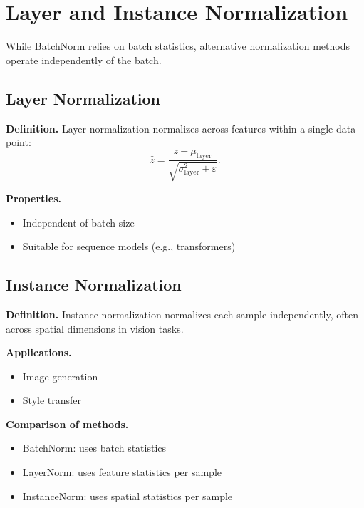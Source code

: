 \section{Layer and Instance Normalization}

While BatchNorm relies on batch statistics, alternative normalization methods operate independently of the batch.

\subsection{Layer Normalization}

\medskip

\noindent
\textbf{Definition.}  
Layer normalization normalizes across features within a single data point:
\[
\hat{z} = \frac{z - \mu_{\text{layer}}}{\sqrt{\sigma_{\text{layer}}^2 + \varepsilon}}.
\]

\medskip

\noindent
\textbf{Properties.}
\begin{itemize}
    \item Independent of batch size
    \item Suitable for sequence models (e.g., transformers)
\end{itemize}

\subsection{Instance Normalization}

\medskip

\noindent
\textbf{Definition.}  
Instance normalization normalizes each sample independently, often across spatial dimensions in vision tasks.

\medskip

\noindent
\textbf{Applications.}
\begin{itemize}
    \item Image generation
    \item Style transfer
\end{itemize}

\medskip

\noindent
\textbf{Comparison of methods.}

\begin{itemize}
    \item BatchNorm: uses batch statistics
    \item LayerNorm: uses feature statistics per sample
    \item InstanceNorm: uses spatial statistics per sample
\end{itemize}

